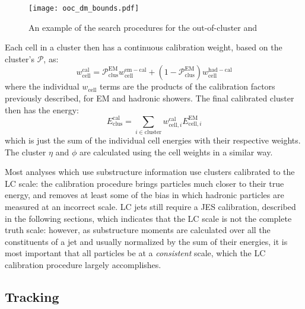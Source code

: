 
\begin{figure}
\centering
\texttt{[image: ooc\_dm\_bounds.pdf]}
\label{fig:jet-reconstruction:cluster-calibration:ooc-dm}
\caption{An example of the search procedures for the out-of-cluster and }
\end{figure}



Each cell in a cluster then has a continuous calibration weight, based on the cluster's $\mathcal{P}$, as:
%
\begin{equation}
w_\mathrm{cell}^\mathrm{cal} = \mathcal{P}^\mathrm{EM}_\mathrm{clus} w_\mathrm{cell}^\mathrm{em-cal} + (1 - \mathcal{P}_\mathrm{clus}^\mathrm{EM}) w_\mathrm{cell}^\mathrm{had-cal}
\end{equation}
%
where the individual $w_\mathrm{cell}$ terms are the products of the calibration factors previously described, for EM and hadronic showers. The final calibrated cluster then has the energy:
%
\begin{equation}
E^\mathrm{cal}_\mathrm{clus} = \sum_{i \in \mathrm{cluster}} w_{\mathrm{cell},i}^\mathrm{cal} E_{\mathrm{cell},i}^\mathrm{EM}
\end{equation}
%
which is just the sum of the individual cell energies with their respective weights. The cluster $\eta$ and $\phi$ are calculated using the cell weights in a similar way.

Most analyses which use substructure information use clusters calibrated to the LC scale: the calibration procedure brings particles much closer to their true energy, and removes at least some of the bias in which hadronic particles are measured at an incorrect scale. LC jets still require a JES calibration, described in the following sections, which indicates that the LC scale is not the complete truth scale: however, as substructure moments are calculated over all the constituents of a jet and usually normalized by the sum of their energies, it is most important that all particles be at a \textit{consistent} scale, which the LC calibration procedure largely accomplishes.

\subsection{Tracking}
\label{tracking}

